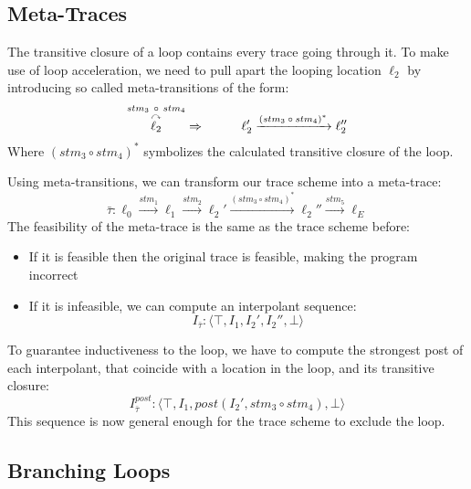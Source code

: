 \documentclass{article}
\begin{document}
\subsection{Meta-Traces}
The transitive closure of a loop contains every trace going through it. To make use of loop acceleration, we need to pull apart the looping location $\ell_2$ by introducing so called meta-transitions of the form:
\begin{equation*}
\overset{stm_3\ \circ \ stm_4}{\overset{\curvearrowright}{\ell_2}} \Rightarrow \hspace*{1cm} \ell_2' \xrightarrow{\text{$(stm_3 \circ stm_4)^*$}} \ell_2''
\end{equation*}
Where $(stm_3 \circ stm_4)^*$ symbolizes the calculated transitive closure of the loop. \par
Using meta-transitions, we can transform our trace scheme into a meta-trace:
\begin{equation*}
\bar{\tau}: \ell_0 \xrightarrow{\text{$stm_1$}} \ell_1 \xrightarrow{\text{$stm_2$}} \ell_2' \xrightarrow{\text{$(stm_3 \circ stm_4)^*$}} \ell_2'' \xrightarrow{\text{$stm_5$}} \ell_E
\end{equation*}
The feasibility of the meta-trace is the same as the trace scheme before: \\
\begin{itemize}
	\item  If it is feasible then the original trace is feasible, making the program incorrect
	\item If it is infeasible, we can compute an interpolant sequence: \\
	\begin{equation*}
	I_{\bar{\tau}}: \langle \top, I_1, I_2', I_2'', \bot  \rangle
	\end{equation*}
\end{itemize}

To guarantee inductiveness to the loop, we have to compute the strongest post of each interpolant, that coincide with a location in the loop, and its transitive closure:
\begin{equation*}
I_{\bar{\tau}}^{post}: \langle \top, I_1, post(I_2', stm_3 \circ stm_4), \bot  \rangle
\end{equation*}
This sequence is now general enough for the trace scheme to exclude the loop.

\subsection{Branching Loops}
\end{document}
